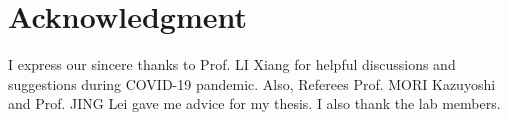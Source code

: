 \chapter*{Acknowledgment}
I express our sincere thanks to Prof. LI Xiang for helpful discussions and suggestions during COVID-19 pandemic. Also, Referees Prof. MORI Kazuyoshi and Prof. JING Lei gave me advice for my thesis. I also thank the lab members.